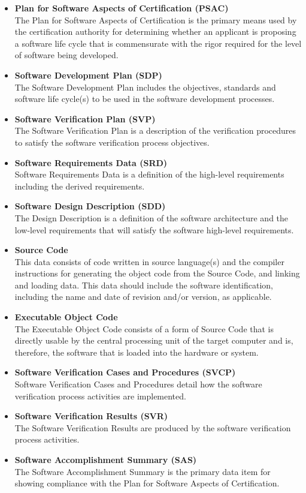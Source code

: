 \documentclass[a4paper]{article}
\begin{document}
\begin{itemize}
	\item \textbf{Plan for Software Aspects of Certification (PSAC)}\\
		The Plan for Software Aspects of Certification is the primary means used by the certification authority for determining whether an applicant is proposing a software life cycle that is commensurate with the rigor required for the level of software being developed.
	\item \textbf{Software Development Plan (SDP)}\\
		The Software Development Plan includes the objectives, standards and software life cycle(s) to be used in the software development processes.
	\item \textbf{Software Verification Plan (SVP)}\\
		The Software Verification Plan is a description of the verification procedures to satisfy the software verification process objectives.
	\item \textbf{Software Requirements Data (SRD)}\\
		Software Requirements Data is a definition of the high-level requirements including the derived requirements.
	\item \textbf{Software Design Description (SDD)}\\
		The Design Description is a definition of the software architecture and the low-level requirements that will satisfy the software high-level requirements.
	\item \textbf{Source Code}\\
		This data consists of code written in source language(s) and the compiler instructions for generating the object code from the Source Code, and linking and loading data. This data should include the software identification, including the name and date of revision and/or version, as applicable.
	\item \textbf{Executable Object Code}\\
		The Executable Object Code consists of a form of Source Code that is directly usable by the central processing unit of the target computer and is, therefore, the software that is loaded into the hardware or system.
	\item \textbf{Software Verification Cases and Procedures (SVCP)}\\
		Software Verification Cases and Procedures detail how the software verification process activities are implemented.
	\item \textbf{Software Verification Results (SVR)}\\
		The Software Verification Results are produced by the software verification process activities.
	\item \textbf{Software Accomplishment Summary (SAS)}\\
		The Software Accomplishment Summary is the primary data item for showing compliance with the Plan for Software Aspects of Certification.
\end{itemize}
\newpage
\end{document}
